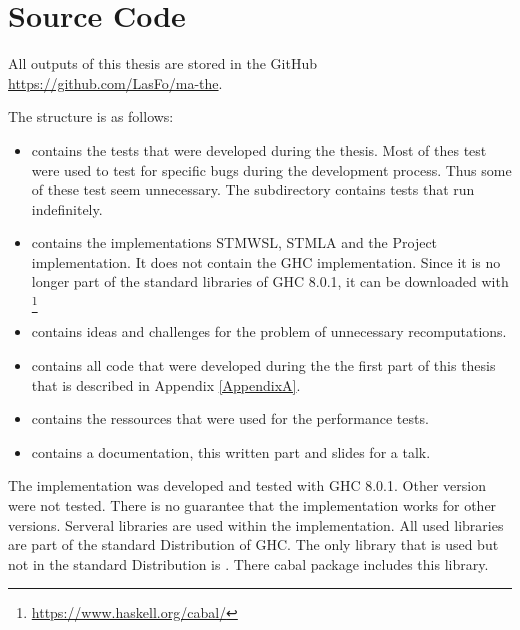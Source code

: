 
\chapter{Source Code} 
\label{AppendixC} 

All outputs of this thesis are stored in the GitHub \url{https://github.com/LasFo/ma-the}.

The structure is as follows:
\begin{itemize}
 \item {} contains the tests that were developed during the thesis. Most of thes test were
                    used to test for specific bugs during the development process. Thus some of these
                    test seem unnecessary. The subdirectory contains
                    tests that run indefinitely. 
 \item {} contains the implementations STMWSL, STMLA and the Project implementation.
                             It does not contain the GHC implementation. Since it is no longer part of 
                             the standard libraries of GHC 8.0.1, it can be downloaded with \footnote{\url{https://www.haskell.org/cabal/}}
 \item {} contains ideas and challenges for the problem of unnecessary recomputations.
 \item {} contains all code that were developed during the the first part of this thesis that is described in Appendix \ref{AppendixA}.
 \item {} contains the ressources that were used for the performance tests.
 \item {} contains a documentation, this written part and slides for a talk.
\end{itemize}

The implementation was developed and tested with GHC 8.0.1. Other version were not tested. There 
is no guarantee that the implementation works for other versions. Serveral libraries are used 
within the implementation. All used libraries are part of the standard Distribution of GHC. 
The only library that is used but not in the standard Distribution is . 
There cabal package  includes this library. 